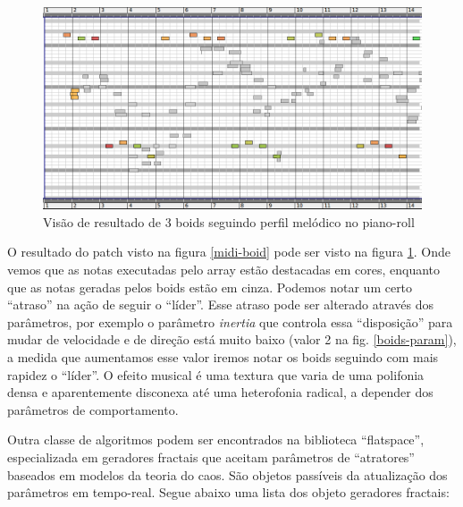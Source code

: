 \documentclass{ppgmus}
\begin{document}
\begin{figure}
\includegraphics[scale=.6]{boids-pianoroll}
\caption{Visão de resultado de 3 boids seguindo perfil melódico no piano-roll}
\label{boids-pianoroll}
\end{figure} 

O resultado do patch visto na figura \ref{midi-boid} pode ser visto
na figura \ref{boids-pianoroll}. Onde vemos que as notas executadas pelo array estão destacadas
em cores, enquanto que as notas geradas pelos boids estão em cinza. Podemos notar um certo ``atraso''
 na ação de seguir o ``líder''. Esse atraso pode ser alterado através dos parâmetros, por exemplo
o parâmetro \textit{inertia} que controla essa ``disposição'' para mudar de velocidade e de direção
está muito baixo (valor 2 na fig. \ref{boids-param}), a medida que aumentamos esse valor iremos notar
os boids seguindo com mais rapidez o ``líder''.
O efeito musical é uma textura que varia de uma polifonia densa e aparentemente disconexa até uma 
heterofonia radical, a depender dos parâmetros de comportamento.



Outra classe de algoritmos podem ser encontrados na biblioteca ``flatspace'', especializada
em geradores fractais que aceitam parâmetros de ``atratores'' baseados em modelos da teoria
do caos. São objetos passíveis da atualização dos parâmetros em tempo-real. 
Segue abaixo uma lista dos objeto geradores fractais:
\end{document}
